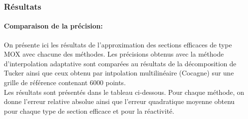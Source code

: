 \subsubsection{Résultats}
\paragraph{Comparaison de la précision:\\}
\hspace{0.5cm}
On présente ici les résultats de l'approximation des sections efficaces de type MOX avec chacune des méthodes.
Les précisions obtenus avec la méthode d'interpolation adaptative sont comparées au résultats de la décomposition de Tucker ainsi que ceux obtenu par intpolation multilinéaire (Cocagne) sur une grille de référence
contenant $6000$ points.\\
Les résultats sont présentés dans le tableau ci-dessous. Pour chaque méthode, on donne l'erreur relative absolue ainsi que l'erreur quadratique moyenne obtenu pour chaque type de section efficace et pour la réactivité.\\
